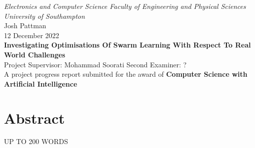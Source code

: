 \documentclass[12pt,a4paper,titlepage]{report}
\begin{document}
	\begin{titlepage}
		\centering\Large\emph{Electronics and Computer Science Faculty of Engineering and Physical Sciences University of Southampton}
		\\[3cm]
		\centering\Large{Josh Pattman} \\
		\centering\Large{12 December 2022} \\
		\centering\huge\textbf{Investigating Optimisations Of Swarm Learning With Respect To Real World Challenges}
		\\[4cm]
		\centering\Large{Project Supervisor: Mohammad Soorati}
		\centering\Large{Second Examiner: ?}
		\\[3cm]
		\centering\Large{A project progress report submitted for the award of \textbf{Computer Science with Artificial Intelligence}}
	\end{titlepage}


	\chapter*{Abstract}
	UP TO 200 WORDS

	\tableofcontents
	
	
	
	
	
	{}
\end{document}
